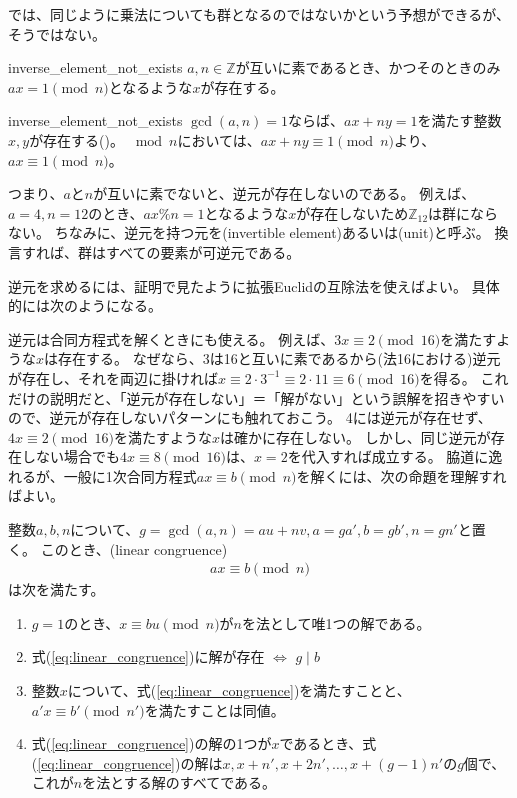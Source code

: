 では、同じように乗法についても群となるのではないかという予想ができるが、そうではない。

\begin{Prop}{}{inverse_element_not_exists}
$a,n\in\mathbb{Z}$が互いに素であるとき、かつそのときのみ$ax=1\pmod{n}$となるような$x$が存在する。
\end{Prop}

\begin{prProof}{inverse_element_not_exists}
$\gcd(a,n)=1$ならば、$ax+ny=1$を満たす整数$x,y$が存在する()。
$\bmod{n}$においては、$ax+ny\equiv1\pmod{n}$より、$ax\equiv1\pmod{n}$。
\end{prProof}

つまり、$a$と$n$が互いに素でないと、逆元が存在しないのである。
例えば、$a=4,n=12$のとき、$ax \% n =1$となるような$x$が存在しないため$\mathbb{Z}_{12}$は群にならない。
ちなみに、逆元を持つ元を(invertible element)あるいは(unit)と呼ぶ。
換言すれば、群はすべての要素が可逆元である。

逆元を求めるには、証明で見たように拡張Euclidの互除法を使えばよい。
具体的には次のようになる。


逆元は合同方程式を解くときにも使える。
例えば、$3x\equiv2\pmod{16}$を満たすような$x$は存在する。
なぜなら、3は16と互いに素であるから(法16における)逆元が存在し、それを両辺に掛ければ$x \equiv 2\cdot3^{-1} \equiv 2\cdot11 \equiv 6\pmod{16}$を得る。
これだけの説明だと、「逆元が存在しない」＝「解がない」という誤解を招きやすいので、逆元が存在しないパターンにも触れておこう。
4には逆元が存在せず、$4x\equiv2\pmod{16}$を満たすような$x$は確かに存在しない。
しかし、同じ逆元が存在しない場合でも$4x\equiv8\pmod{16}$は、$x=2$を代入すれば成立する。
脇道に逸れるが、一般に1次合同方程式$ax\equiv b\pmod{n}$を解くには、次の命題を理解すればよい。

\begin{Prop}{}{}
整数$a,b,n$について、$g=\gcd(a,n)=au+nv,a=ga',b=gb',n=gn'$と置く。
このとき、(linear congruence)
\begin{align}\label{eq:linear_congruence}
ax \equiv b \pmod{n}
\end{align}
は次を満たす。
\begin{enumerate}
 \item $g=1$のとき、$x\equiv bu\pmod{n}$が$n$を法として唯1つの解である。
 \item 式(\ref{eq:linear_congruence})に解が存在 $\iff$ $g \mid b$
 \item 整数$x$について、式(\ref{eq:linear_congruence})を満たすことと、$a'x \equiv b' \pmod{n'}$を満たすことは同値。
 \item 式(\ref{eq:linear_congruence})の解の1つが$x$であるとき、式(\ref{eq:linear_congruence})の解は$x, x+n', x+2n', \ldots, x+(g-1)n'$の$g$個で、これが$n$を法とする解のすべてである。
\end{enumerate}
\end{Prop}

